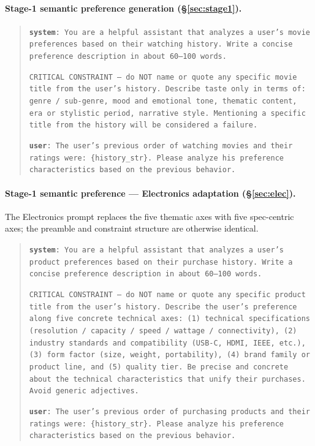 \documentclass[11pt]{article}
\begin{document}
\paragraph{Stage-1 semantic preference generation
(\S\ref{sec:stage1}).}
\begin{quote}
\small
\texttt{\textbf{system}: You are a helpful assistant that analyzes a
user's movie preferences based on their watching history. Write a
concise preference description in about 60--100 words.}

\texttt{CRITICAL CONSTRAINT --- do NOT name or quote any specific
movie title from the user's history. Describe taste only in terms of:
genre / sub-genre, mood and emotional tone, thematic content, era or
stylistic period, narrative style. Mentioning a specific title from
the history will be considered a failure.}

\texttt{\textbf{user}: The user's previous order of watching movies
and their ratings were: \{history\_str\}. Please analyze his
preference characteristics based on the previous behavior.}
\end{quote}

\paragraph{Stage-1 semantic preference --- Electronics adaptation
(\S\ref{sec:elec}).}
The Electronics prompt replaces the five thematic axes with five
spec-centric axes; the preamble and constraint structure are
otherwise identical.
\begin{quote}
\small
\texttt{\textbf{system}: You are a helpful assistant that analyzes a
user's product preferences based on their purchase history. Write a
concise preference description in about 60--100 words.}

\texttt{CRITICAL CONSTRAINT --- do NOT name or quote any specific
product title from the user's history. Describe the user's
preference along five concrete technical axes: (1) technical
specifications (resolution / capacity / speed / wattage /
connectivity), (2) industry standards and compatibility (USB-C,
HDMI, IEEE, etc.), (3) form factor (size, weight, portability), (4)
brand family or product line, and (5) quality tier. Be precise and
concrete about the technical characteristics that unify their
purchases. Avoid generic adjectives.}

\texttt{\textbf{user}: The user's previous order of purchasing
products and their ratings were: \{history\_str\}. Please analyze
his preference characteristics based on the previous behavior.}
\end{quote}
\end{document}
